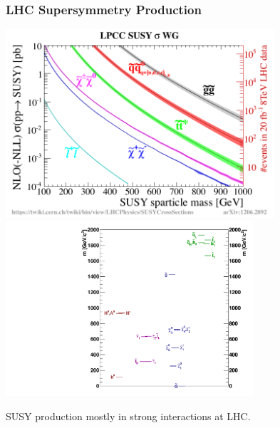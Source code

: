 \documentclass{beamer}
\begin{document}
\begin{frame}
\frametitle{LHC Supersymmetry Production}
 \begin{minipage}[t]{0.5\linewidth}
   \includegraphics[height=7cm,width=0.45\paperwidth]{THESISPLOTS/SUSY-XSEC.pdf}
   \includegraphics[height=6.5cm,width=0.40\paperwidth]{THESISPLOTS/gmsb_Lambda180_CTau10000.pdf}
 \end{minipage} 
   
 \begin{minipage}[b]{\linewidth}
   SUSY production mostly in strong interactions at LHC.
 \end{minipage}
\end{frame}

\end{document}

